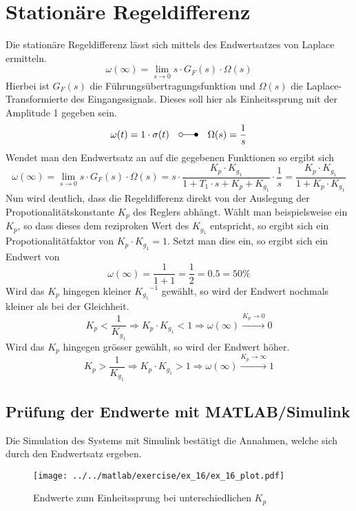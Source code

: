 \section{Stationäre Regeldifferenz}
Die stationäre Regeldifferenz lässt sich mittels des Endwertsatzes von
Laplace ermitteln.
\[
	\omega(\infty)
	= \lim_{s \rightarrow 0} s \cdot G_F(s) \cdot \Omega(s)	
\]
Hierbei ist $G_F(s)$ die Führungsübertragungsfunktion und $\Omega(s)$ die
Laplace-Transformierte des Eingangssignals. Dieses soll hier als
Einheitssprung mit der Amplitude 1 gegeben sein.
\[
	\omega(t)
	= 1 \cdot \sigma(t) \quad \laplace \quad \Omega(s) = \frac{1}{s}
\]
Wendet man den Endwertsatz an auf die gegebenen Funktionen so ergibt sich
\[
	\omega(\infty)
	= \lim_{s \rightarrow 0} s \cdot G_F(s) \cdot \Omega(s)	
	= s \cdot \frac{
		K_p \cdot K_{g_1}
	}{
		1 + T_1 \cdot s + K_p + K_{g_1}
	} \cdot \frac{1}{s}
	= \frac{K_p \cdot K_{g_1}}{1 + K_p \cdot K_{g_1}}
\]
Nun wird deutlich, dass die Regeldifferenz direkt von der Auslegung der
Propotionalitätskonstante $K_p$ des Reglers abhängt. Wählt man beispielsweise
ein $K_p$, so dass dieses dem reziproken Wert des $K_{g_1}$ entspricht, so
ergibt sich ein Propotionalitätfaktor von $K_p \cdot K_{g_1} = 1$. Setzt man
dies ein, so ergibt sich ein Endwert von 
\[
	\omega(\infty) = \frac{1}{1+1} = \frac{1}{2} = 0.5 = 50\%	
\]
Wird das $K_p$ hingegen kleiner ${K_{g_1}}^{-1}$ gewählt, so wird der Endwert
nochmals kleiner als bei der Gleichheit.
\[
	K_p < \frac{1}{K_{g_1}}
	\Rightarrow K_p \cdot K_{g_1} < 1 
		\Rightarrow \omega(\infty) \xrightarrow{K_p \rightarrow 0} 0
\]
Wird das $K_p$ hingegen grösser gewählt, so wird der Endwert höher.
\[
	K_p > \frac{1}{K_{g_1}}
	\Rightarrow K_p \cdot K_{g_1} > 1
		\Rightarrow \omega(\infty) \xrightarrow{K_p \rightarrow \infty} 1
\]

\subsection{Prüfung der Endwerte mit MATLAB/Simulink}
Die Simulation des Systems mit Simulink bestätigt die Annahmen, welche sich
durch den Endwertsatz ergeben.

\begin{figure}[h!]
	\centering
	\texttt{[image: ../../matlab/exercise/ex\_16/ex\_16\_plot.pdf]}
	\caption{Endwerte zum Einheitssprung bei unterschiedlichen $K_p$}
\end{figure}
